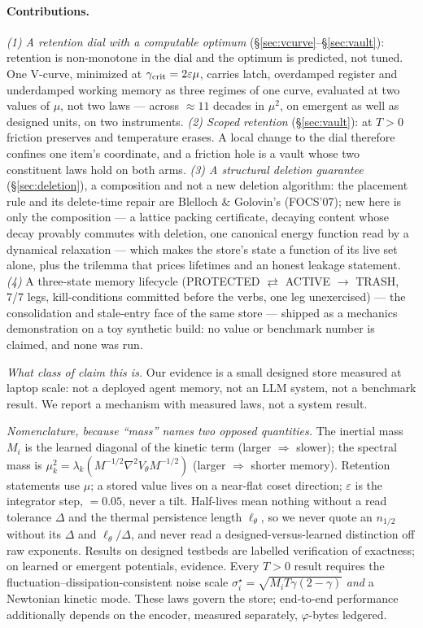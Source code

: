 \documentclass{article}
\begin{document}
\paragraph{Contributions.} \emph{(1) A retention dial with a computable optimum} (\S\ref{sec:vcurve}--\S\ref{sec:vault}): retention is non-monotone in the dial and the optimum is predicted, not tuned. One V-curve, minimized at $\gamma_{\rm crit}=2\varepsilon\mu$, carries latch, overdamped register and underdamped working memory as three regimes of one curve, evaluated at two values of $\mu$, not two laws --- across $\approx11$ decades in $\mu^2$, on emergent as well as designed units, on two instruments. \emph{(2) Scoped retention} (\S\ref{sec:vault}): at $T>0$ friction preserves and temperature erases. A local change to the dial therefore confines one item's coordinate, and a friction hole is a vault whose two constituent laws hold on both arms. \emph{(3) A structural deletion guarantee} (\S\ref{sec:deletion}), a composition and not a new deletion algorithm: the placement rule and its delete-time repair are Blelloch \& Golovin's (FOCS'07); new here is only the composition --- a lattice packing certificate, decaying content whose decay provably commutes with deletion, one canonical energy function read by a dynamical relaxation --- which makes the store's state a function of its live set alone, plus the trilemma that prices lifetimes and an honest leakage statement. \emph{(4)} A three-state memory lifecycle (PROTECTED $\rightleftarrows$ ACTIVE $\to$ TRASH, 7/7 legs, kill-conditions committed before the verbs, one leg unexercised) --- the consolidation and stale-entry face of the same store --- shipped as a mechanics demonstration on a toy synthetic build: no value or benchmark number is claimed, and none was run.

\emph{What class of claim this is.} Our evidence is a small designed store measured at laptop scale: not a deployed agent memory, not an LLM system, not a benchmark result. We report a mechanism with measured laws, not a system result.

{\emph{Nomenclature, because ``mass'' names two opposed quantities.} The inertial mass $M_i$ is the learned diagonal of the kinetic term (larger $\Rightarrow$ slower); the spectral mass is $\mu_k^2=\lambda_k(M^{-1/2}\nabla^2V_\theta M^{-1/2})$ (larger $\Rightarrow$ shorter memory). Retention statements use $\mu$; a stored value lives on a near-flat coset direction; $\varepsilon$ is the integrator step, $=0.05$, never a tilt. Half-lives mean nothing without a read tolerance $\Delta$ and the thermal persistence length $\ell_\theta$, so we never quote an $n_{1/2}$ without its $\Delta$ and $\ell_\theta/\Delta$, and never read a designed-versus-learned distinction off raw exponents. Results on designed testbeds are labelled verification of exactness; on learned or emergent potentials, evidence. Every $T>0$ result requires the fluctuation--dissipation-consistent noise scale $\sigma^\star_i=\sqrt{M_iT\gamma(2-\gamma)}$ \emph{and} a Newtonian kinetic mode. These laws govern the store; end-to-end performance additionally depends on the encoder, measured separately, $\varphi$-bytes ledgered.\par}
\end{document}
